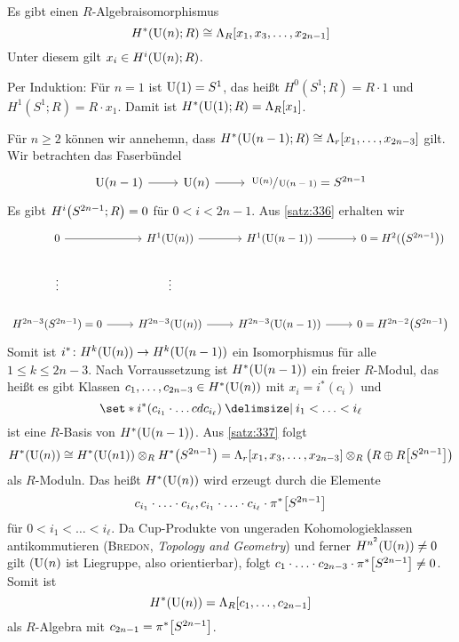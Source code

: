 \begin{satz}
	Es gibt einen $R$-Algebraisomorphismus 
	\[
		H^*(\Un(n);R) \cong \Lambda_R \benbrace*{x_1, x_3, \ldots , x_{2n-1}}
	\]
	Unter diesem gilt $x_i \in H^i(\operatorname{U}(n);R)$.
\end{satz}
\begin{beweis}
	Per Induktion: Für $n=1$ ist $\operatorname{U}(1)=S^1$, das heißt $H^0(S^1;R) = R \cdot 1$ und $H^1(S^1;R) = R \cdot x_1$.
	Damit ist $H^*(\operatorname{U}(1);R) = \Lambda_R[x_1]$.
	
	Für $n \ge 2$ können wir annehemn, dass $H^* \enbrace*{\Un(n-1);R} \cong \Lambda_r \benbrace*{x_1, \ldots , x_{2n-3}}$ gilt.
	Wir betrachten das Faserbündel
	\[
		\begin{tikzcd}
			\Un(n-1) \rar & \Un(n) \rar & \sfrac{\Un(n)}{\Un(n-1)} = S^{2n-1}
		\end{tikzcd}
	\]
	Es gibt $H^i \enbrace*{S^{2n-1};R} = 0$ für $0 < i < 2n-1$. Aus \autoref{satz:336} erhalten wir 
	\[
		\begin{tikzcd}
			0 \rar & H^1 \enbrace*{\Un(n)} \rar & H^1 \enbrace*{\Un(n-1)} \rar & 0 = H^2( \enbrace*{S^{2n-1}}) \\
			\vdots & \vdots \\
			H^{2n-3}(S^{2n-1}) = 0  \rar & H^{2n-3} \enbrace*{\Un(n)} \rar & H^{2n-3} \enbrace*{\Un(n-1)} \rar & 0 = H^{2n-2} \enbrace*{S^{2n-1}}
		\end{tikzcd}
	\]
	Somit ist $i^* \colon H^k \enbrace*{\Un(n)} \to H^k \enbrace*{\Un(n-1)}$ ein Isomorphismus für alle $1\le k \le 2n-3$.
	Nach Vorraussetzung ist $H^* \enbrace*{\Un(n-1)}$ ein freier $R$-Modul, das heißt es gibt Klassen $c_1, \ldots ,c_{2n-3} \in H^*(\operatorname{U}(n))$ mit $x_i = i^*(c_i)$ und 
	\[
		\set*{i^* \enbrace*{c_{i_1} \cdot \ldots cd c_{i_\ell}} \given i_1 < \ldots < i_\ell}
	\]
	ist eine $R$-Basis von $H^* \enbrace*{\Un(n-1)}$.
	Aus \autoref{satz:337} folgt
	\[
		H^* \enbrace*{\Un(n)} \cong H^* \enbrace*{\Un(n1)} \otimes_R H^* \enbrace*{S^{2n-1}} = \Lambda_r \benbrace*{x_1, x_3, \ldots ,x_{2n-3}} \otimes_R \enbrace*{R \oplus R \benbrace*{S^{2n-1}}}
	\]
	als $R$-Moduln.
	Das heißt $H^* \enbrace*{\Un(n)}$ wird erzeugt durch die Elemente 
	\[
		c_{i_1} \cdot \ldots \cdot c_{i_\ell} , c_{i_1} \cdot \ldots \cdot c_{i_\ell} \cdot \pi^* \benbrace*{S^{2n-1}}
	\]
	für $0 < i_1 < \ldots < i_\ell$.
	Da Cup-Produkte von ungeraden Kohomologieklassen antikommutieren (\textsc{Bredon}, \emph{Topology and Geometry}) und ferner $H^{n^2}(\operatorname{U}(n)) \neq 0$ gilt ($\operatorname{U}(n)$ ist Liegruppe, also orientierbar), folgt $c_1 \cdot \ldots \cdot c_{2n-3} \cdot \pi^* \benbrace*{S^{2n-1}} \neq 0$.
	Somit ist 
	\[
		H^* \enbrace*{\Un(n)} = \Lambda_R \benbrace*{c_1, \ldots , c_{2n-1}}
	\]
	als $R$-Algebra mit $c_{2n-1} = \pi^*\benbrace*{S^{2n-1}}$.
\end{beweis}


